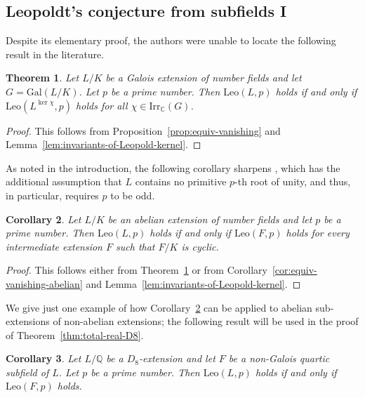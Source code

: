 \documentclass[12pt]{amsart}
\theoremstyle{plain}
\newtheorem{theorem}{Theorem}[section]
\newtheorem{corollary}[theorem]{Corollary}
\theoremstyle{remark}
\theoremstyle{definition}
\newcommand{\Q}{\mathbb{Q}}
\newcommand{\C}{\mathbb{C}}
\newcommand{\Gal}{\mathrm{Gal}}
\newcommand{\Irr}{\mathrm{Irr}}
\newcommand{\Leo}{\mathrm{Leo}}
\numberwithin{equation}{section}
\begin{document}
\subsection{Leopoldt's conjecture from subfields I}\label{subsec:Leo-from-subfields-I}
Despite its elementary proof, the authors were unable to locate the following result in the literature.

\begin{theorem}\label{thm:leopoldt-to-kernels-chars}
Let $L/K$ be a Galois extension of number fields and let $G=\Gal(L/K)$.
Let $p$ be a prime number.
Then
$\Leo(L,p)$ holds if and only if $\Leo(L^{\ker\chi},p)$ holds for all $\chi \in \Irr_{\C}(G)$.
\end{theorem}

\begin{proof}
This follows from Proposition~\ref{prop:equiv-vanishing} and 
Lemma~\ref{lem:invariants-of-Leopold-kernel}.
\end{proof}

As noted in the introduction, the following corollary sharpens \cite[Lemma 3.1]{MR1190214}, which 
has the additional assumption that $L$ contains no primitive $p$-th  root of unity, and thus, in particular, requires $p$ to be odd.

\begin{corollary}\label{cor:leopoldt-abelian-to-cyclic}
Let $L/K$ be an abelian extension of number fields and let $p$ be a prime number.
Then $\Leo(L,p)$ holds if and only if $\Leo(F,p)$ holds for every intermediate extension $F$
such that $F/K$ is cyclic.
\end{corollary}

\begin{proof}
This follows either from Theorem~\ref{thm:leopoldt-to-kernels-chars} 
or from Corollary~\ref{cor:equiv-vanishing-abelian} and 
Lemma~\ref{lem:invariants-of-Leopold-kernel}.
\end{proof}

We give just one example of how Corollary~\ref{cor:leopoldt-abelian-to-cyclic} can be applied to abelian sub-extensions of non-abelian extensions; the following result will be used in the proof of 
Theorem~\ref{thm:total-real-D8}.

\begin{corollary}\label{cor:D8-quartic-leopoldt}
Let $L/\Q$ be a $D_{8}$-extension and let $F$ be a non-Galois quartic subfield of $L$.
Let $p$ be a prime number. 
Then $\Leo(L,p)$ holds if and only if $\Leo(F,p)$ holds.
\end{corollary}
\end{document}
